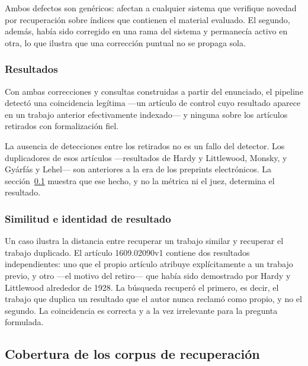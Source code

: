 \documentclass[12pt,a4paper]{article}
\theoremstyle{remark}
\begin{document}
Ambos defectos son genéricos: afectan a cualquier sistema que verifique novedad por recuperación sobre índices que contienen el material evaluado. El segundo, además, había sido corregido en una rama del sistema y permanecía activo en otra, lo que ilustra que una corrección puntual no se propaga sola.

\subsubsection{Resultados}

Con ambas correcciones y consultas construidas a partir del enunciado, el pipeline detectó una coincidencia legítima —un artículo de control cuyo resultado aparece en un trabajo anterior efectivamente indexado— y ninguna sobre los artículos retirados con formalización fiel.


La ausencia de detecciones entre los retirados no es un fallo del detector. Los duplicadores de esos artículos —resultados de Hardy y Littlewood, Monsky, y Gyárfás y Lehel— son anteriores a la era de los preprints electrónicos. La sección~\ref{ssec:cobertura} muestra que ese hecho, y no la métrica ni el juez, determina el resultado.

\subsubsection{Similitud e identidad de resultado}

Un caso ilustra la distancia entre recuperar un trabajo similar y recuperar el trabajo duplicado. El artículo 1609.02090v1 contiene dos resultados independientes: uno que el propio artículo atribuye explícitamente a un trabajo previo, y otro —el motivo del retiro— que había sido demostrado por Hardy y Littlewood alrededor de 1928. La búsqueda recuperó el primero, es decir, el trabajo que duplica un resultado que el autor nunca reclamó como propio, y no el segundo. La coincidencia es correcta y a la vez irrelevante para la pregunta formulada.

\subsection{Cobertura de los corpus de recuperación}
\label{ssec:cobertura}
\end{document}
